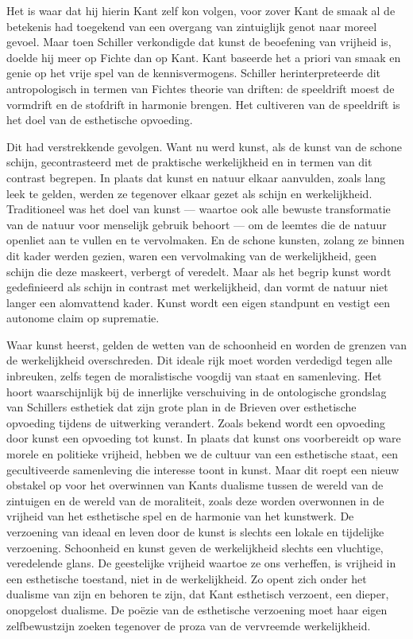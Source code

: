 Het is waar dat hij hierin Kant zelf kon volgen, voor zover Kant de smaak al de betekenis had toegekend van een overgang van zintuiglijk genot naar moreel gevoel. Maar toen Schiller verkondigde dat kunst de beoefening van vrijheid is, doelde hij meer op Fichte dan op Kant. Kant baseerde het a priori van smaak en genie op het vrije spel van de kennisvermogens. Schiller herinterpreteerde dit antropologisch in termen van Fichtes theorie van driften: de speeldrift moest de vormdrift en de stofdrift in harmonie brengen. Het cultiveren van de speeldrift is het doel van de esthetische opvoeding.

Dit had verstrekkende gevolgen. Want nu werd kunst, als de kunst van de schone schijn, gecontrasteerd met de praktische werkelijkheid en in termen van dit contrast begrepen. In plaats dat kunst en natuur elkaar aanvulden, zoals lang leek te gelden, werden ze tegenover elkaar gezet als schijn en werkelijkheid. Traditioneel was het doel van kunst — waartoe ook alle bewuste transformatie van de natuur voor menselijk gebruik behoort — om de leemtes die de natuur openliet aan te vullen en te vervolmaken. En de schone kunsten, zolang ze binnen dit kader werden gezien, waren een vervolmaking van de werkelijkheid, geen schijn die deze maskeert, verbergt of veredelt. Maar als het begrip kunst wordt gedefinieerd als schijn in contrast met werkelijkheid, dan vormt de natuur niet langer een alomvattend kader. Kunst wordt een eigen standpunt en vestigt een autonome claim op suprematie.

Waar kunst heerst, gelden de wetten van de schoonheid en worden de grenzen van de werkelijkheid overschreden. Dit ideale rijk moet worden verdedigd tegen alle inbreuken, zelfs tegen de moralistische voogdij van staat en samenleving. Het hoort waarschijnlijk bij de innerlijke verschuiving in de ontologische grondslag van Schillers esthetiek dat zijn grote plan in de Brieven over esthetische opvoeding tijdens de uitwerking verandert. Zoals bekend wordt een opvoeding door kunst een opvoeding tot kunst. In plaats dat kunst ons voorbereidt op ware morele en politieke vrijheid, hebben we de cultuur van een esthetische staat, een gecultiveerde samenleving die interesse toont in kunst. Maar dit roept een nieuw obstakel op voor het overwinnen van Kants dualisme tussen de wereld van de zintuigen en de wereld van de moraliteit, zoals deze worden overwonnen in de vrijheid van het esthetische spel en de harmonie van het kunstwerk. De verzoening van ideaal en leven door de kunst is slechts een lokale en tijdelijke verzoening. Schoonheid en kunst geven de werkelijkheid slechts een vluchtige, veredelende glans. De geestelijke vrijheid waartoe ze ons verheffen, is vrijheid in een esthetische toestand, niet in de werkelijkheid. Zo opent zich onder het dualisme van zijn en behoren te zijn, dat Kant esthetisch verzoent, een dieper, onopgelost dualisme. De poëzie van de esthetische verzoening moet haar eigen zelfbewustzijn zoeken tegenover de proza van de vervreemde werkelijkheid.

